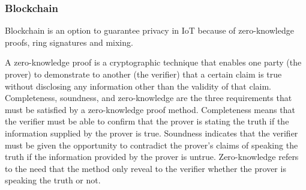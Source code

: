 \documentclass[conference]{IEEEtran}
\begin{document}



\subsubsection{Blockchain}

Blockchain is an option to guarantee privacy in IoT because of zero-knowledge
proofs, ring signatures and mixing.

A zero-knowledge proof is a cryptographic technique that enables one party
(the prover) to demonstrate to another (the verifier) that a certain claim
is true without disclosing any information other than the validity of that
claim. Completeness, soundness, and zero-knowledge are the three requirements
that must be satisfied by a zero-knowledge proof method. Completeness means
that the verifier must be able to confirm that the prover is stating the truth
if the information supplied by the prover is true. Soundness indicates that
the verifier must be given the opportunity to contradict the prover's claims
of speaking the truth if the information provided by the prover is untrue.
Zero-knowledge refers to the need that the method only reveal to the verifier
whether the prover is speaking the truth or not.
\end{document}
